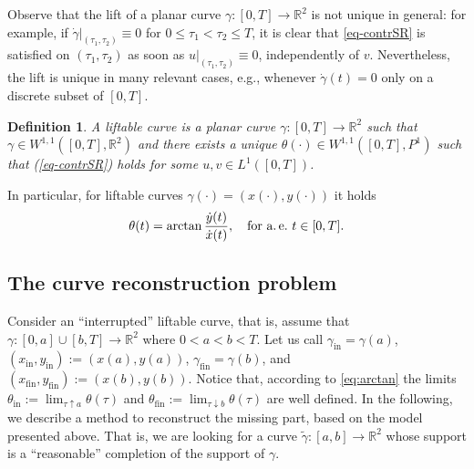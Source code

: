 \documentclass[proc]{edpsmath}
\renewcommand{\th}{\theta}
\newtheorem{definition}[theorem]{Definition}
\renewcommand{\r}[1]{(\ref{#1})}
\begin{document}
\begin{rmrk}
Observe that the lift of a planar curve $\gamma:[0,T]\to\mathbb R^2$ is not unique in general: for example, if $\dot\gamma|_{(\tau_1,\tau_2)}\equiv 0$ for $0\le\tau_1<\tau_2\le T$, it is clear that \eqref{eq-contrSR} is satisfied on $(\tau_1,\tau_2)$ as soon as $u|_{(\tau_1,\tau_2)}\equiv 0$, independently of $v$. Nevertheless, the lift is unique in many relevant cases, e.g., whenever $\dot\gamma(t)= 0$ only on a discrete subset of $[0,T]$.
\end{rmrk}

\begin{definition}
  A \emph{liftable curve} is a planar curve $\gamma:[0,T]\to \mathbb R^2$ such that $\gamma\in W^{1,1}([0,T],\mathbb R^2)$ and there exists a unique $\th(\cdot)\in W^{1,1}([0,T],P^1)$ such that \r{eq-contrSR} holds for some $u,v\in L^1([0,T])$.
\end{definition}

In particular, for liftable curves $\gamma(\cdot) = (x(\cdot),y(\cdot))$ it holds
\begin{equation}\label{eq:arctan}
  \theta(t) = \arctan\frac{\dot y(t)}{\dot x(t)},\quad \text{for a.\,e.\ } t \in[0,T].
\end{equation}



\subsection{The curve reconstruction problem}

Consider an ``interrupted'' liftable curve, that is, assume that $\gamma:[0,a]\cup[b,T]\to\mathbb R^2$ where $0<a<b<T$.
Let us call $\gamma_{\text{in}}=\gamma(a)$, $(x_{\text{in}},y_{\text{in}}):=(x(a),y(a))$, $\gamma_{\text{fin}}=\gamma(b)$, and $(x_{\text{fin}},y_{\text{fin}}):=(x(b),y(b))$.
Notice that, according to \eqref{eq:arctan} the limits $\theta_{\text{in}}:=\lim_{\tau\uparrow a}\theta(\tau)$ and  $\theta_{\text{fin}}:=\lim_{\tau\downarrow b}\theta(\tau)$ are well defined.
In the following, we describe a method to reconstruct the missing part, based on the model presented above. That is, we are looking for a curve $\tilde\gamma:[a,b]\to\mathbb R^2$ whose support is a ``reasonable'' completion of the support of $\gamma$.
\end{document}
